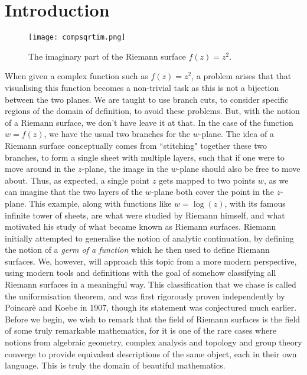 \documentclass[11pt]{report}
\theoremstyle{definition}
\begin{document}
\chapter*{Introduction}
\begin{wrapfigure}{l}{0.3\textwidth}
  \begin{center}
    \texttt{[image: compsqrtim.png]}
    \caption*{The imaginary part of the Riemann surface $f(z)=z^2$.}
  \end{center}
\end{wrapfigure} When given a complex function such as $f(z)=z^2$, a problem arises that that visualising this function becomes a non-trivial task as this is not a bijection between the two planes. We are taught to use branch cuts, to consider specific regions of the domain of definition, to avoid these problems. But, with the notion of a Riemann surface, we don't have leave it at that. In the case of the function $w = f(z)$, we have the usual two branches for the $w$-plane. The idea of a Riemann surface conceptually comes from ``stitching" together these two branches, to form a single sheet with multiple layers, such that if one were to move around in the $z$-plane, the image in the $w$-plane should also be free to move about. Thus, as expected, a single point $z$ gets mapped to two points $w$, as we can imagine that the two layers of the $w$-plane both cover the point in the $z$-plane. This example, along with functions like $w = \log(z)$, with its famous infinite tower of sheets, are what were studied by Riemann himself, and what motivated his study of what became known as Riemann surfaces. Riemann initially attempted to generalise the notion of analytic continuation, by defining the notion of a \emph{germ of a function} which he then used to define Riemann surfaces. We, however, will approach this topic from a more modern perspective, using modern tools and definitions with the goal of somehow classifying all Riemann surfaces in a meaningful way. This classification that we chase is called the uniformisation theorem, and was first rigorously proven independently by Poincar\`{e} and Koebe in 1907, though its statement was conjectured much earlier. Before we begin, we wish to remark that the field of Riemann surfaces is the field of some truly remarkable mathematics, for it is one of the rare cases where notions from algebraic geometry, complex analysis and topology and group theory converge to provide equivalent descriptions of the same object, each in their own language. This is truly the domain of beautiful mathematics.
\end{document}
